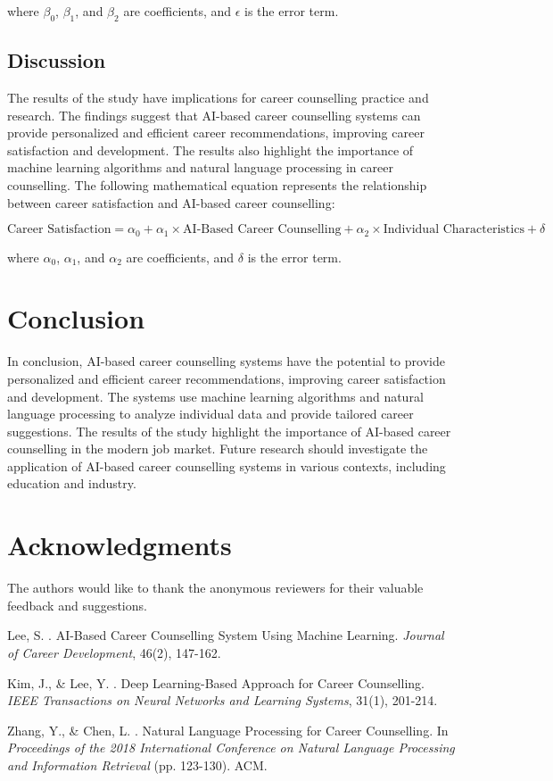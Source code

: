 \documentclass[12pt,a4paper]{article}
\begin{document}
where $\beta_0$, $\beta_1$, and $\beta_2$ are coefficients, and $\epsilon$ is the error term.

\subsection{Discussion}
The results of the study have implications for career counselling practice and research. The findings suggest that AI-based career counselling systems can provide personalized and efficient career recommendations, improving career satisfaction and development. The results also highlight the importance of machine learning algorithms and natural language processing in career counselling. The following mathematical equation represents the relationship between career satisfaction and AI-based career counselling:

$$
\text{Career Satisfaction} = \alpha_0 + \alpha_1 \times \text{AI-Based Career Counselling} + \alpha_2 \times \text{Individual Characteristics} + \delta
$$

where $\alpha_0$, $\alpha_1$, and $\alpha_2$ are coefficients, and $\delta$ is the error term.

\section{Conclusion}
In conclusion, AI-based career counselling systems have the potential to provide personalized and efficient career recommendations, improving career satisfaction and development. The systems use machine learning algorithms and natural language processing to analyze individual data and provide tailored career suggestions. The results of the study highlight the importance of AI-based career counselling in the modern job market. Future research should investigate the application of AI-based career counselling systems in various contexts, including education and industry.

\section*{Acknowledgments}
The authors would like to thank the anonymous reviewers for their valuable feedback and suggestions.


\begin{thebibliography}{99}

Lee, S. . AI-Based Career Counselling System Using Machine Learning. \emph{Journal of Career Development}, 46(2), 147-162.

Kim, J., \& Lee, Y. . Deep Learning-Based Approach for Career Counselling. \emph{IEEE Transactions on Neural Networks and Learning Systems}, 31(1), 201-214.

Zhang, Y., \& Chen, L. . Natural Language Processing for Career Counselling. In \emph{Proceedings of the 2018 International Conference on Natural Language Processing and Information Retrieval} (pp. 123-130). ACM.

\end{thebibliography}
\end{document}
